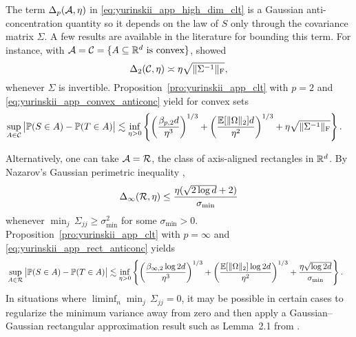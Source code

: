 The term $\Delta_p(\mathcal{A}, \eta)$
in \eqref{eq:yurinskii_app_high_dim_clt} is a Gaussian anti-concentration
quantity
so it depends on the law of $S$ only through the covariance matrix $\Sigma$.
A few results are available in the literature
for bounding this term.
For instance, with
$\mathcal{A} = \mathcal{C} = \{A \subseteq \mathbb{R}^d \text{ is convex}\}$,
\citet{nazarov2003maximal} showed
%
\begin{equation}%
  \label{eq:yurinskii_app_convex_anticonc}
  \Delta_2(\cC, \eta)
  \asymp
  \eta\sqrt{\|\Sigma^{-1}\|_{\rF}},
\end{equation}
%
whenever $\Sigma$ is invertible.
Proposition~\ref{pro:yurinskii_app_clt} with $p=2$
and \eqref{eq:yurinskii_app_convex_anticonc} yield for convex sets
%
\begin{align*}
  \sup_{A\in \mathcal{C}}
  \big|\mathbb{P}(S\in A) -\mathbb{P}(T\in A)\big|
  &\lesssim
  \inf_{\eta > 0}
  \left\{
    \left(\frac{\beta_{p,2} d}{\eta^3}\right)^{1/3}
    + \left(\frac{\mathbb{E}[\|\Omega \|_2] d}{\eta^2}\right)^{1/3}
    + \eta \sqrt{\|\Sigma^{-1}\|_{\mathrm{F}}}
  \right\}.
\end{align*}

Alternatively, one can take $\mathcal{A} = \mathcal{R}$,
the class of axis-aligned rectangles in $\mathbb{R}^d$.
By Nazarov's Gaussian perimetric inequality
\citep{nazarov2003maximal,chernozhukov2017central},
%
\begin{align}%
  \label{eq:yurinskii_app_rect_anticonc}
  \Delta_\infty(\cR, \eta)
  \leq \frac{\eta (\sqrt{2\log d} + 2)}{\sigma_{\min}}
\end{align}
%
whenever $\min_j \, \Sigma_{j j} \geq \sigma_{\min}^2$
for some $\sigma_{\min}>0$.
Proposition~\ref{pro:yurinskii_app_clt} with $p = \infty$
and \eqref{eq:yurinskii_app_rect_anticonc} yields
%
\begin{align*}%
  &\sup_{A\in \cR}
  \big|\P(S\in A) -\P(T\in A)\big|
  \lesssim
  \inf_{\eta > 0}
  \left\{
    \left(\frac{\beta_{\infty,2} \log 2d}{\eta^3}\right)^{1/3}
    + \left(\frac{\E[\|\Omega \|_2] \log 2d}{\eta^2}\right)^{1/3}
    + \frac{\eta \sqrt{\log 2d}}{\sigma_{\min}}
  \right\}.
\end{align*}
%
In situations where
$\liminf_n \min_j \, \Sigma_{j j} = 0$,
it may be possible in certain cases to regularize
the minimum variance away from zero and then apply
a Gaussian--Gaussian rectangular approximation result
such as Lemma~2.1 from \citet{chernozhukov2023nearly}.

